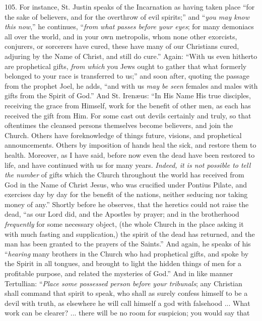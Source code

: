 105. For instance,
St. Justin speaks of the Incarnation as having taken place ``for
the sake of believers, and for the overthrow of evil spirits;'' and ``\emph{you
may know this now},'' he continues, ``\emph{from what passes before your
eyes}; for many demoniacs all over the world, and in your own
metropolis, whom none other exorcists, conjurers, or sorcerers have
cured, these have many of our Christians cured, adjuring by the Name
of Christ, and still do cure.'' Again: ``With us even hitherto are
prophetical gifts, \emph{from which} you Jews ought to gather that
what formerly belonged to your race is transferred to us;'' and soon
after, quoting the passage from the prophet Joel, he adds, ``and with
us \emph{may be seen} females and males with gifts from the Spirit of
God.'' And St. Irenæus: ``In His Name His true disciples, receiving the
grace from Himself, work for the benefit of other men, as each has
received the gift from Him. For some cast out devils certainly and
truly, so that oftentimes the cleansed persons themselves become
believers, and join the Church. Others have foreknowledge of things
future, visions, and prophetical announcements. Others by imposition
of hands heal the sick, and restore them to health. Moreover, as I
have said, before now even the dead have been restored to life, and
have continued with us for many years. \emph{Indeed, it is not possible
to tell the number} of gifts which the Church throughout the world
has received from God in the Name of Christ Jesus, who was crucified
under Pontius Pilate, and exercises day by day for the benefit
of the nations, neither seducing nor taking money of any.'' Shortly
before he observes, that the heretics could not raise the dead, ``as
our Lord did, and the Apostles by prayer; and in the brotherhood \emph{frequently}
for some necessary object, (the whole Church in the place asking it
with much fasting and supplication,) the spirit of the dead has
returned, and the man has been granted to the prayers of the Saints.''
And again, he speaks of his ``\emph{hearing} many brothers in the
Church who had prophetical gifts, and spoke by the Spirit in all
tongues, and brought to light the hidden things of men for a
profitable purpose, and related the mysteries of God.'' And in like
manner Tertullian: ``\emph{Place some possessed person before your
tribunals}; any Christian shall command that spirit to speak, who
shall as surely confess himself to be a devil with truth, as elsewhere
he will call himself a god with falsehood ... What work can be
clearer? ... there will be no room for suspicion; you would say that
